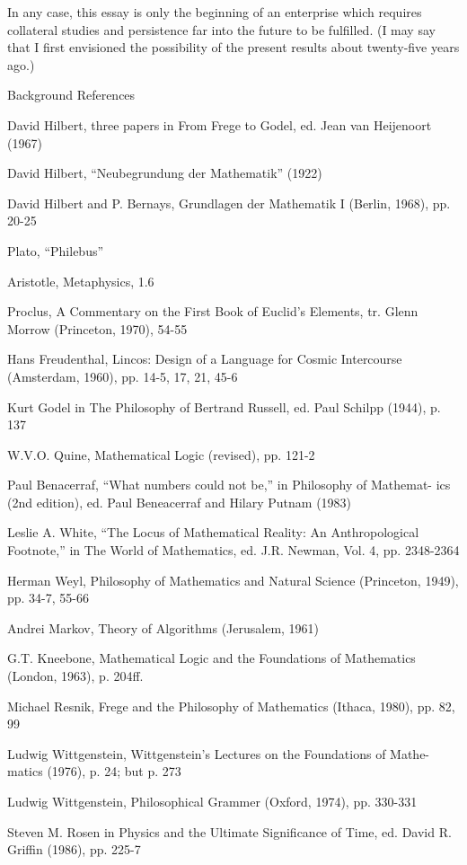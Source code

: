 In any case, this essay is only the beginning of an enterprise which 
requires collateral studies and persistence far into the future to be 
fulfilled. (I may say that I first envisioned the possibility of the present 
results about twenty-five years ago.) 


Background References 


David Hilbert, three papers in From Frege to Godel, ed. Jean van Heijenoort 
(1967) 

David Hilbert, “Neubegrundung der Mathematik” (1922) 

David Hilbert and P. Bernays, Grundlagen der Mathematik I (Berlin, 1968), 
pp. 20-25 

Plato, “Philebus” 

Aristotle, Metaphysics, 1.6 

Proclus, A Commentary on the First Book of Euclid’s Elements, tr. Glenn 
Morrow (Princeton, 1970), 54-55 

Hans Freudenthal, Lincos: Design of a Language for Cosmic Intercourse 
(Amsterdam, 1960), pp. 14-5, 17, 21, 45-6 

Kurt Godel in The Philosophy of Bertrand Russell, ed. Paul Schilpp (1944), p. 
137 

W.V.O. Quine, Mathematical Logic (revised), pp. 121-2 

Paul Benacerraf, “What numbers could not be,” in Philosophy of Mathemat- 
ics (2nd edition), ed. Paul Beneacerraf and Hilary Putnam (1983) 

Leslie A. White, “The Locus of Mathematical Reality: An Anthropological 
Footnote,” in The World of Mathematics, ed. J.R. Newman, Vol. 4, pp. 
2348-2364 

Herman Weyl, Philosophy of Mathematics and Natural Science (Princeton, 
1949), pp. 34-7, 55-66 

Andrei Markov, Theory of Algorithms (Jerusalem, 1961) 

G.T. Kneebone, Mathematical Logic and the Foundations of Mathematics 
(London, 1963), p. 204ff. 

Michael Resnik, Frege and the Philosophy of Mathematics (Ithaca, 1980), pp. 
82, 99 

Ludwig Wittgenstein, Wittgenstein’s Lectures on the Foundations of Mathe- 
matics (1976), p. 24; but p. 273 

Ludwig Wittgenstein, Philosophical Grammer (Oxford, 1974), pp. 330-331 

Steven M. Rosen in Physics and the Ultimate Significance of Time, ed. David 
R. Griffin (1986), pp. 225-7 

